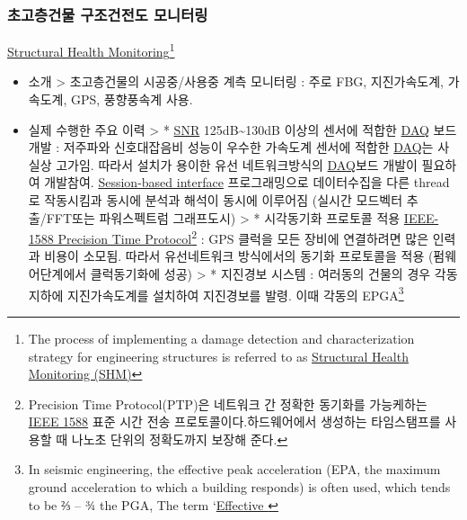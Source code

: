 \documentclass[]{article}
\begin{document}
\subsubsection{초고층건물 구조건전도 모니터링}\href{https://en.wikipedia.org/wiki/Structural_health_monitoring}{Structural Health Monitoring}\footnote{The process of implementing a damage detection and characterization strategy for engineering structures is referred to as \href{https://en.wikipedia.org/wiki/Structural_health_monitoring}{Structural Health Monitoring (SHM)}}
\begin{itemize}
\item
  소개 \textgreater{} 초고층건물의 시공중/사용중 계측 모니터링 : 주로
  FBG, 지진가속도계, 가속도계, GPS, 풍향풍속계 사용.
\item
  실제 수행한 주요 이력 \textgreater{} *
  \href{https://en.wikipedia.org/wiki/Signal-to-noise_ratio}{SNR}
  125dB\textasciitilde{}130dB 이상의 센서에 적합한
  \href{https://en.wikipedia.org/wiki/Data_acquisition}{DAQ} 보드 개발 :
  저주파와 신호대잡음비 성능이 우수한 가속도계 센서에 적합한
  \href{https://en.wikipedia.org/wiki/Data_acquisition}{DAQ}는 사실상
  고가임. 따라서 설치가 용이한 유선 네트워크방식의
  \href{https://en.wikipedia.org/wiki/Data_acquisition}{DAQ}보드 개발이
  필요하여 개발참여.
  \href{http://kr.mathworks.com/help/daq/examples/getting-started-with-session-based-interface-using-ni-devices.html}{Session-based
  interface} 프로그래밍으로 데이터수집을 다른 thread로 작동시킴과 동시에
  분석과 해석이 동시에 이루어짐 (실시간 모드벡터 추출/FFT또는
  파워스펙트럼 그래프도시) \textgreater{} * 시각동기화 프로토콜 적용
  \href{https://ko.wikipedia.org/wiki/IEEE_1588}{IEEE-1588 Precision
  Time Protocol}\footnote{Precision Time Protocol(PTP)은 네트워크 간
    정확한 동기화를 가능케하는
    \href{https://ko.wikipedia.org/wiki/IEEE_1588}{IEEE 1588} 표준 시간
    전송 프로토콜이다.하드웨어에서 생성하는 타임스탬프를 사용할 때
    나노초 단위의 정확도까지 보장해 준다.} : GPS 클럭을 모든 장비에
  연결하려면 많은 인력과 비용이 소모됨. 따라서 유선네트워크 방식에서의
  동기화 프로토콜을 적용 (펌웨어단계에서 클럭동기화에 성공)
  \textgreater{} * 지진경보 시스템 : 여러동의 건물의 경우 각동 지하에
  지진가속도계를 설치하여 지진경보를 발령. 이때 각동의 EPGA\footnote{In
    seismic engineering, the effective peak acceleration (EPA, the
    maximum ground acceleration to which a building responds) is often
    used, which tends to be ⅔ -- ¾ the PGA, The term
    `\href{http://www.teachmefinance.com/Scientific_Terms/Effective\%20peak\%20ground\%20acceleration.html\#ixzz3iNuQcQLs}{Effective
}}
\end{itemize}
\end{document}
